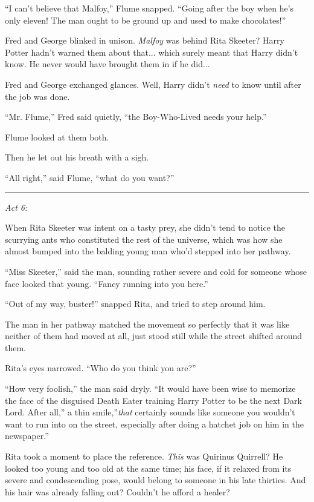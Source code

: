 ``I can't believe that Malfoy,'' Flume snapped. ``Going after the boy
when he's only eleven! The man ought to be ground up and used to make
chocolates!''

Fred and George blinked in unison. \emph{Malfoy} was behind Rita
Skeeter? Harry Potter hadn't warned them about that... which surely
meant that Harry didn't know. He never would have brought them in if he
did...

Fred and George exchanged glances. Well, Harry didn't \emph{need} to
know until after the job was done.

``Mr. Flume,'' Fred said quietly, ``the Boy-Who-Lived needs your help.''

Flume looked at them both.

Then he let out his breath with a sigh.

``All right,'' said Flume, ``what do you want?''

\begin{center}\rule{3in}{0.4pt}\end{center}

\emph{Act 6:}

When Rita Skeeter was intent on a tasty prey, she didn't tend to notice
the scurrying ants who constituted the rest of the universe, which was
how she almost bumped into the balding young man who'd stepped into her
pathway.

``Miss Skeeter,'' said the man, sounding rather severe and cold for
someone whose face looked that young. ``Fancy running into you here.''

``Out of my way, buster!'' snapped Rita, and tried to step around him.

The man in her pathway matched the movement so perfectly that it was
like neither of them had moved at all, just stood still while the street
shifted around them.

Rita's eyes narrowed. ``Who do you think you are?''

``How very foolish,'' the man said dryly. ``It would have been wise to
memorize the face of the disguised Death Eater training Harry Potter to
be the next Dark Lord. After all,'' a thin smile,''\emph{that} certainly
sounds like someone you wouldn't want to run into on the street,
especially after doing a hatchet job on him in the newspaper.''

Rita took a moment to place the reference. \emph{This} was Quirinus
Quirrell? He looked too young and too old at the same time; his face, if
it relaxed from its severe and condescending pose, would belong to
someone in his late thirties. And his hair was already falling out?
Couldn't he afford a healer?


